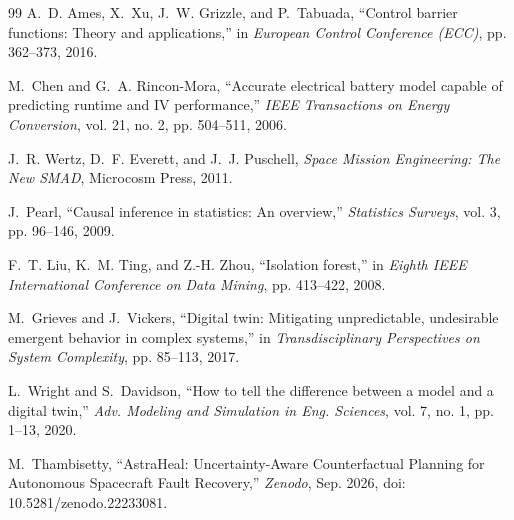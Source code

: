 \documentclass[10pt,twocolumn]{article}
\begin{document}
\begin{thebibliography}{99}
A.~D. Ames, X.~Xu, J.~W. Grizzle, and P.~Tabuada, ``Control barrier functions: Theory and applications,'' in \emph{European Control Conference (ECC)}, pp. 362--373, 2016.

M.~Chen and G.~A. Rincon-Mora, ``Accurate electrical battery model capable of predicting runtime and IV performance,'' \emph{IEEE Transactions on Energy Conversion}, vol. 21, no. 2, pp. 504--511, 2006.

J.~R. Wertz, D.~F. Everett, and J.~J. Puschell, \emph{Space Mission Engineering: The New SMAD}, Microcosm Press, 2011.

J.~Pearl, ``Causal inference in statistics: An overview,'' \emph{Statistics Surveys}, vol. 3, pp. 96--146, 2009.

F.~T. Liu, K.~M. Ting, and Z.-H. Zhou, ``Isolation forest,'' in \emph{Eighth IEEE International Conference on Data Mining}, pp. 413--422, 2008.

M.~Grieves and J.~Vickers, ``Digital twin: Mitigating unpredictable, undesirable emergent behavior in complex systems,'' in \emph{Transdisciplinary Perspectives on System Complexity}, pp. 85--113, 2017.

L.~Wright and S.~Davidson, ``How to tell the difference between a model and a digital twin,'' \emph{Adv. Modeling and Simulation in Eng. Sciences}, vol. 7, no. 1, pp. 1--13, 2020.

M.~Thambisetty, ``AstraHeal: Uncertainty-Aware Counterfactual Planning for Autonomous Spacecraft Fault Recovery,'' \emph{Zenodo}, Sep. 2026, doi: 10.5281/zenodo.22233081.

\end{thebibliography}
\end{document}
